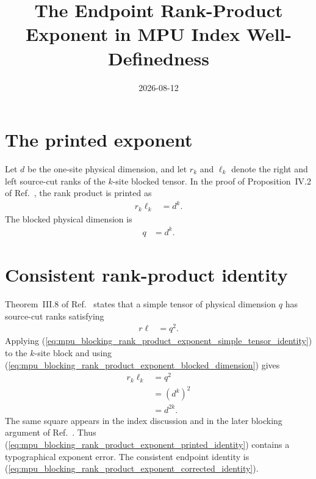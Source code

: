 \documentclass{article}
\title{The Endpoint Rank-Product Exponent in MPU Index Well-Definedness}
\author{}
\date{2026-08-12}
\begin{document}
\maketitle
{}

\section{The printed exponent}

Let $d$ be the one-site physical dimension, and let $r_k$ and $\ell_k$ denote
the right and left source-cut ranks of the $k$-site blocked tensor. In the
proof of Proposition~IV.2 of Ref.~\cite{Cirac2017MPU}, the rank product is
printed as
\begin{align}
    r_k\ell_k
        &=d^k.
    \label{eq:mpu_blocking_rank_product_exponent_printed_identity}
\end{align}
The blocked physical dimension is
\begin{align}
    q
        &=d^k.
    \label{eq:mpu_blocking_rank_product_exponent_blocked_dimension}
\end{align}

\section{Consistent rank-product identity}

Theorem~III.8 of Ref.~\cite{Cirac2017MPU} states that a simple tensor of
physical dimension $q$ has source-cut ranks satisfying
\begin{align}
    r\ell
        &=q^2.
    \label{eq:mpu_blocking_rank_product_exponent_simple_tensor_identity}
\end{align}
Applying
(\ref{eq:mpu_blocking_rank_product_exponent_simple_tensor_identity}) to the
$k$-site block and using
(\ref{eq:mpu_blocking_rank_product_exponent_blocked_dimension}) gives
\begin{align}
    r_k\ell_k
        &=q^2
    \label{eq:mpu_blocking_rank_product_exponent_blocked_rank_product}\\
        &=(d^k)^2
    \label{eq:mpu_blocking_rank_product_exponent_substituted_dimension}\\
        &=d^{2k}.
    \label{eq:mpu_blocking_rank_product_exponent_corrected_identity}
\end{align}
The same square appears in the index discussion and in the later blocking
argument of Ref.~\cite{Cirac2017MPU}. Thus
(\ref{eq:mpu_blocking_rank_product_exponent_printed_identity}) contains a
typographical exponent error. The consistent endpoint identity is
(\ref{eq:mpu_blocking_rank_product_exponent_corrected_identity}).
\end{document}

